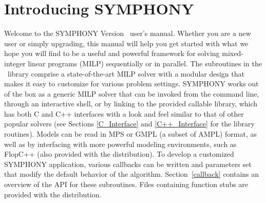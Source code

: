 
\section{Introducing SYMPHONY \VER}
\label{whats-new}

Welcome to the SYMPHONY Version \VER\ user's manual. Whether you are a new
user or simply upgrading, this manual will help you get started with what we
hope you will find to be a useful and powerful framework for solving
mixed-integer linear programs (MILP) sequentially or in parallel. The
subroutines in the \BB\ library comprise a state-of-the-art MILP solver with a
modular design that makes it easy to customize for various problem settings.
SYMPHONY works out of the box as a generic MILP solver that can be invoked
from the command line, through an interactive shell, or by linking to the
provided callable library, which has both C and C++ interfaces with a look and
feel similar to that of other popular solvers (see Sections \ref{C_Interface}
and \ref{C++_Interface} for the library routines). Models can be read in MPS
or GMPL (a subset of AMPL) format, as well as by interfacing with more
powerful modeling environments, such as FlopC++ (also provided with the
distribution). To develop a customized SYMPHONY application, various callbacks
can be written and parameters set that modify the default behavior of the
algorithm. Section~\ref{callback} contains an overview of the API for these
subroutines. Files containing function stubs are provided with the
distribution.

